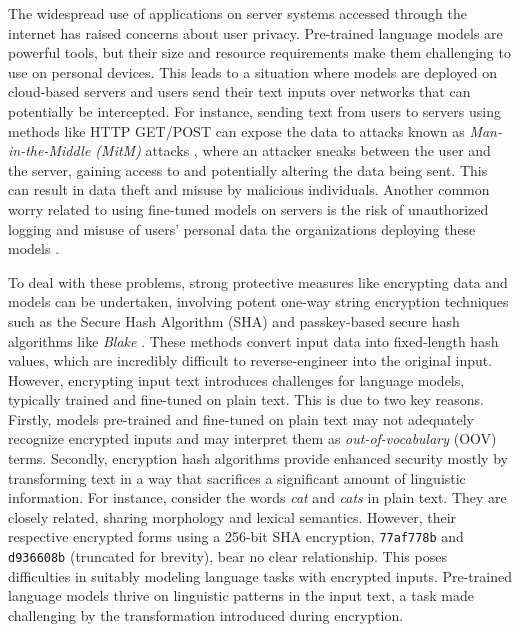 \documentclass[letterpaper]{article} %
\begin{document}
The widespread use of applications on server systems accessed through the internet has raised concerns about user privacy. Pre-trained language models are powerful tools, but their size and resource requirements make them challenging to use on personal devices. This leads to a situation where models are deployed on cloud-based servers and users send their text inputs over networks that can potentially be intercepted. For instance, sending text from users to servers using methods like HTTP GET/POST can expose the data to attacks known as \textit{Man-in-the-Middle (MitM)} attacks \cite{callegati2009man}, where an attacker sneaks between the user and the server, gaining access to and potentially altering the data being sent. This can result in data theft and misuse by malicious individuals. Another common worry related to using fine-tuned models on servers is the risk of unauthorized logging and misuse of users' personal data the organizations deploying these models \cite{o2003some,jones2005informed}. 

To deal with these problems, strong protective measures like encrypting data and models can be undertaken, involving potent one-way string encryption techniques such as the Secure Hash Algorithm (SHA) and passkey-based secure hash algorithms like \emph{Blake} \cite{fernandes2015implementation}. These methods convert input data into fixed-length hash values, which are incredibly difficult to reverse-engineer into the original input. However, encrypting input text introduces challenges for language models, typically trained and fine-tuned on plain text. This is due to two key reasons. Firstly, models pre-trained and fine-tuned on plain text may not adequately recognize encrypted inputs and may interpret them as \emph{out-of-vocabulary} (OOV) terms. Secondly, encryption hash algorithms provide enhanced security mostly by transforming text in a way that sacrifices a significant amount of linguistic information. For instance, consider the words \emph{cat} and \emph{cats} in plain text. They are closely related, sharing morphology and lexical semantics. However, their respective encrypted forms using a 256-bit SHA encryption, \texttt{77af778b} and \texttt{d936608b} (truncated for brevity), bear no clear relationship. This poses difficulties in suitably modeling language tasks with encrypted inputs. Pre-trained language models thrive on linguistic patterns in the input text, a task made challenging by the transformation introduced during encryption.
\end{document}
